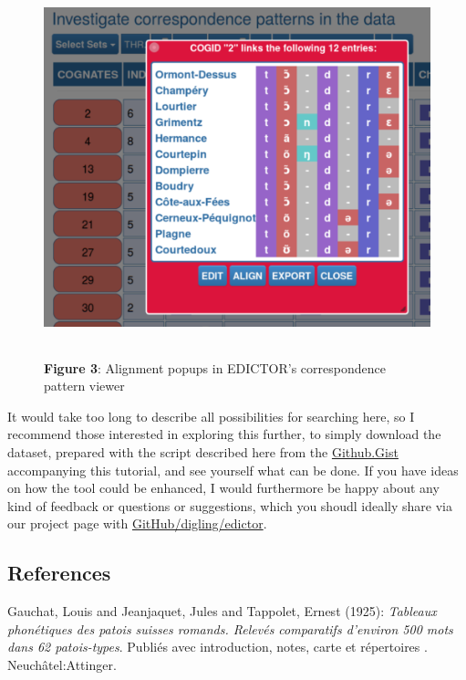 \documentclass[
  a4paper,
  14pt,
  oneside,
  tablecaptionabove
]{scrbook}
\begin{document}
\begin{figure}[h!]
\centering
\includegraphics[width=5.20833in,height=4.29167in]{images/__f-origin.hypotheses.org_wp-content_blogs.dir_4500_files_2019_02_edictor3-500x412.png}
\captionsetup{labelformat=empty}
\caption{\textbf{Figure 3}: Alignment popups in EDICTOR's correspondence pattern viewer}
\end{figure}

It would take too long to describe all possibilities for searching here,
so I recommend those interested in exploring this further, to simply
download the dataset, prepared with the script described here from the
\href{https://gist.github.com/LinguList/994317214fbdc78460feb551b113b05f}{Github.Gist}
accompanying this tutorial, and see yourself what can be done. If you
have ideas on how the tool could be enhanced, I would furthermore be
happy about any kind of feedback or questions or suggestions, which you
shoudl ideally share via our project page with
\href{https://github.com/digling/edictor}{GitHub/digling/edictor}.

\subsection*{References}

\nopagebreak\hangindent=0.7cm {\small  Gauchat, Louis and Jeanjaquet, Jules and Tappolet, Ernest (1925):
\emph{Tableaux phonétiques des patois suisses romands. Relevés comparatifs
d'environ 500 mots dans 62 patois-types}. Publiés avec introduction,
notes, carte et répertoires . Neuchâtel:Attinger.}
\end{document}
